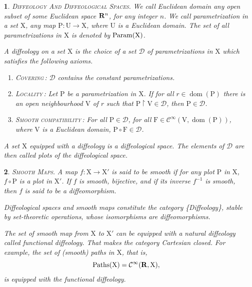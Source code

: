 \documentclass[12pt,reqno]{amsart}
\theoremstyle{article}
\newtheorem{article}{}
\def\artlabel[#1]{\textsc{#1}.}
\def \F{\mathrm F}
\def \P{\mathrm P}
\def \U{\mathrm U}
\def \V{\mathrm V}
\def \X{\mathrm X}
\newcommand{\RR}{{\bf R}}
\newcommand{\cD}{{\mathcal D}}
\newcommand{\Cinfty}{{\mathcal C}^{\infty}}
\DeclareMathOperator{\dom}{dom}
\newcommand{\Param}{{\rm Param}}
\DeclareMathOperator{\Paths}{Paths}
\begin{document}
  \begin{article}\artlabel[Diffeology And Diffeological Spaces]
    \label{Diffeology-And-Diffeological-Spaces}
    We call \emph{Euclidean domain} any open subset of some Euclidean space $\RR^n$,
    for any integer $n$.
    We call \emph{parametrization} in a set $\X$,
    any map $\P \colon \U \to \X$,
    where $\U$ is a Euclidean domain.
    The set of all parametrizations in $\X$ is denoted by $\Param(\X)$.
    
    A \emph{diffeology} on a set $\X$ is the choice of a set $\cD$ of parametrizations in $\X$ which satisfies the following axioms.
    
    \begin{enumerate}
      \item[1.] \textsc{Covering}\,: $\cD$ contains the constant parametrizations.
      \item[2.] \textsc{Locality}\,: Let $\P$ be a parametrization in $\X$.
      If for all $r \in \dom(\P)$ there is an open neighbourhood $\V$ of $r$ such that $\P \restriction \V \in \cD$,
      then $\P \in \cD$.
      \item[3.] \textsc{Smooth compatibility}\,: For all $\P \in \cD$,
      for all $\F \in \Cinfty(\V,\dom(\P))$,
      where $\V$ is a Euclidean domain,
      $\P \circ \F \in \cD$.
    \end{enumerate}
    
    A set $\X$ equipped with a diffeology is a \emph{diffeological space}.
    The elements of $\cD$ are then called \emph{plots} of the diffeological space.
  \end{article}
  
  \begin{article}\artlabel[Smooth Maps]
    A map $f \colon \X \to \X'$ is said to be \emph{smooth} if for any plot $\P$ in $\X$,
    $f \circ \P$ is a plot in $\X'$.
    If $f$ is smooth,
    bijective,
    and if its inverse $f^{-1}$ is smooth,
    then $f$ is said to be a \emph{diffeomorphism}.
    
    Diffeological spaces and smooth maps constitute the category \{Diffeology\},
    stable by set-theoretic operations,
    whose isomorphisms are diffeomorphisms.
    
    The set of smooth map from $\X$ to $\X'$ can be equipped with a natural diffeology called \emph{functional diffeology}.
    That makes the category Cartesian closed.
    For example,
    the set of (smooth) paths in $\X$,
    that is,
    $$
    \Paths(\X) = \Cinfty(\RR,\X),
    $$
    is equipped with the functional diffeology.
  \end{article}
  
\end{document}
